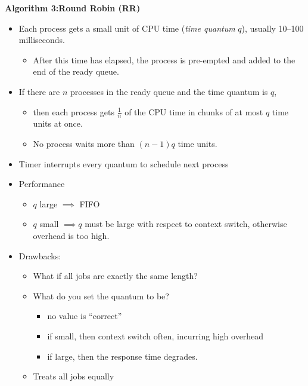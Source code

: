 \documentclass[11pt,a4paper]{article}
\begin{document}
\textbf{Algorithm 3:\@ Round Robin (RR)}
\begin{itemize}
    \item Each process gets a small unit of CPU time (\emph{time quantum} $q$),
        usually 10--100 milliseconds.
        \begin{itemize}
            \item After this time has elapsed, the process is pre-empted and added to the
                end of the ready queue.
        \end{itemize}
    \item If there are $n$ processes in the ready queue and the time quantum is $q$,
        \begin{itemize}
            \item then each process gets $\frac{1}{n}$ of the CPU time in chunks of at most
                $q$ time units at once.
            \item No process waits more than $(n-1)q$ time units.
        \end{itemize}
    \item Timer interrupts every quantum to schedule next process
    \item Performance
        \begin{itemize}
            \item $q$ large $\implies$ FIFO
            \item $q$ small $\implies q$ must be large with respect to context switch,
                otherwise overhead is too high.
        \end{itemize}
    \item Drawbacks:
        \begin{itemize}
            \item What if all jobs are exactly the same length?
            \item What do you set the quantum to be?
                \begin{itemize}
                    \item no value is ``correct''
                    \item if small, then context switch often, incurring high overhead
                    \item if large, then the response time degrades.
                \end{itemize}
            \item Treats all jobs equally
        \end{itemize}
\end{itemize}
\end{document}
